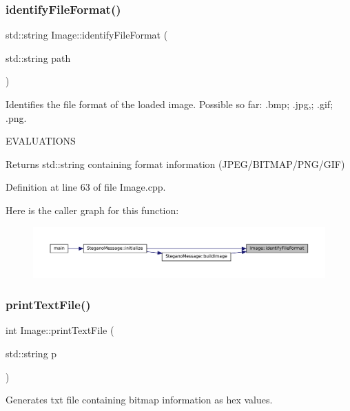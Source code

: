 \subsubsection{\texorpdfstring{identifyFileFormat()}{identifyFileFormat()}}
{\footnotesize\ttfamily std\+::string Image\+::identify\+File\+Format (\begin{DoxyParamCaption}\item[{std\+::string}]{path }\end{DoxyParamCaption})\hspace{0.3cm}{\ttfamily [static]}}



Identifies the file format of the loaded image. Possible so far\+: .bmp; .jpg,; .gif; .png. 

E\+V\+A\+L\+U\+A\+T\+I\+O\+NS\begin{DoxyReturn}{Returns}
std\+::string containing format information (J\+P\+E\+G/\+B\+I\+T\+M\+A\+P/\+P\+N\+G/\+G\+IF) 
\end{DoxyReturn}


Definition at line 63 of file Image.\+cpp.

Here is the caller graph for this function\+:\nopagebreak
\begin{figure}[H]
\begin{center}
\leavevmode
\includegraphics[width=350pt]{classImage_ac4e8db14cfd60a6a7085e6fcb83488a4_icgraph}
\end{center}
\end{figure}
\mbox{\label{classImage_ae5daf791502caefeae1b15360d354513}} 
\subsubsection{\texorpdfstring{printTextFile()}{printTextFile()}}
{\footnotesize\ttfamily int Image\+::print\+Text\+File (\begin{DoxyParamCaption}\item[{std\+::string}]{p }\end{DoxyParamCaption})}



Generates txt file containing bitmap information as hex values. 

